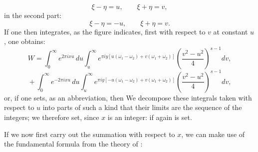 \[ \xi - \eta = u, \qquad \xi + \eta = v, \]
in the second part:
\[ \xi - \eta = -u, \qquad \xi + \eta = v. \]
If one then integrates, as the figure indicates, first with respect
to $v$ at constant $u$, one obtains:
\[
W = \int_0^\infty e^{2\pi ixu}\,du\int_u^\infty e^{\pi iy[u(\omega_1-\omega_2)+v(\omega_1+\omega_2)]}\left(\frac{v^2-u^2}{4}\right)^{s-1}dv,
\]
\[
{}+\int_0^\infty e^{-2\pi ixu}\,du\int_u^\infty e^{\pi iy[-u(\omega_1-\omega_2)+v(\omega_1+\omega_2)]}\left(\frac{v^2-u^2}{4}\right)^{s-1}dv,
\]
or, if one sets, as an abbreviation,
then
We decompose these integrals taken with respect to $u$ into parts of
such a kind that their limits are the sequence of the integers; we
therefore set, since $x$ is an integer:
if again
is set.

If we now first carry out the summation with respect to $x$, we can
make use of the fundamental formula from the theory of :
